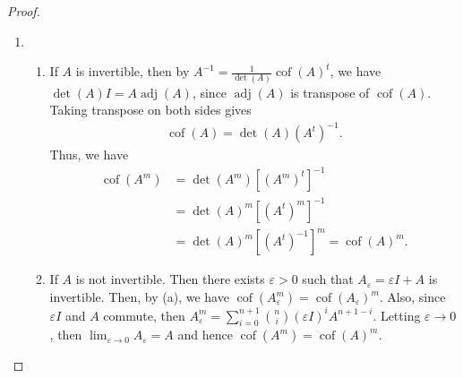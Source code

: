 \documentclass[11pt]{article}
\theoremstyle{definition}
\numberwithin{equation}{subsection}
\begin{document}
\begin{proof}
~\begin{enumerate}[label=(\alph*)]
    \item \begin{enumerate}[label=\arabic*)]
        \item If $A$ is invertible, then by $A^{-1} = \frac{1}{\det(A)} \operatorname{cof}(A)^t$, we have $\det(A) I = A \operatorname{adj}(A)$, since $\operatorname{adj}(A)$ is transpose of $\operatorname{cof}(A)$. Taking transpose on both sides gives
        \begin{align*}
            \operatorname{cof}(A) = \det(A) (A^t)^{-1}.
        \end{align*}
        Thus, we have
        \begin{align*}
            \operatorname{cof}(A^m) & = \det(A^m) [(A^m)^t]^{-1} \\
            & = \det(A)^m [(A^t)^m]^{-1} \\
            & = \det(A)^m [(A^t)^{-1}]^m = \operatorname{cof}(A)^m.
        \end{align*}
        
        \item If $A$ is not invertible. Then there exists $\varepsilon > 0$ such that $A_\varepsilon = \varepsilon I + A$ is invertible. Then, by (a), we have $\operatorname{cof}(A_\varepsilon^m) = \operatorname{cof}(A_\varepsilon)^m$. Also, since $\varepsilon I$ and $A$ commute, then $A_\varepsilon^m = \sum^{n+1}_{i=0} \binom{n}{i} (\varepsilon I)^i A^{n+1-i}$. Letting $\varepsilon \to 0$, then $\lim_{\varepsilon \to 0} A_\varepsilon = A$ and hence $\operatorname{cof}(A^m) = \operatorname{cof}(A)^m$.
    \end{enumerate}
    

\end{enumerate}
\end{proof}
\end{document}
